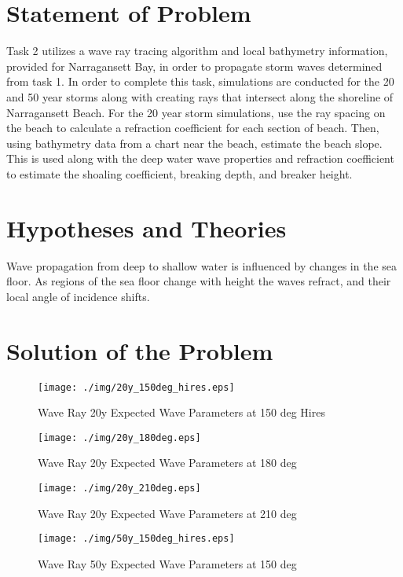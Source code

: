 \section{Statement of Problem}
Task 2 utilizes a wave ray tracing algorithm and local bathymetry information, provided for Narragansett Bay, in order to propagate storm waves determined from task 1. In order to complete this task, simulations are conducted for the 20 and 50 year storms along with creating rays that intersect along the shoreline of Narragansett Beach. For the 20 year storm simulations, use the ray spacing on the beach to calculate a refraction coefficient for each section of beach. Then, using bathymetry data from a chart near the beach, estimate the beach slope. This is used along with the deep water wave properties and refraction coefficient to estimate the shoaling coefficient, breaking depth, and breaker height. 
\section{Hypotheses and Theories}

Wave propagation from deep to shallow water is influenced by changes in the sea floor. As regions of the sea floor change with height the waves refract, and their local angle of incidence shifts. 

\section{Solution of the Problem}

\begin{figure}[H]
\centering
\texttt{[image: ./img/20y\_150deg\_hires.eps]}
\caption{Wave Ray 20y Expected Wave Parameters at 150 deg Hires}
\label{fig:prob4WHvWD}
\end{figure}

\begin{figure}[H]
\centering
\texttt{[image: ./img/20y\_180deg.eps]}
\caption{Wave Ray 20y Expected Wave Parameters at 180 deg}
\label{fig:prob4WHvWD}
\end{figure}

\begin{figure}[H]
\centering
\texttt{[image: ./img/20y\_210deg.eps]}
\caption{Wave Ray 20y Expected Wave Parameters at 210 deg}
\label{fig:prob4WHvWD}
\end{figure}


\begin{figure}[H]
\centering
\texttt{[image: ./img/50y\_150deg\_hires.eps]}
\caption{Wave Ray 50y Expected Wave Parameters at 150 deg}
\label{fig:prob4WHvWD}
\end{figure}

